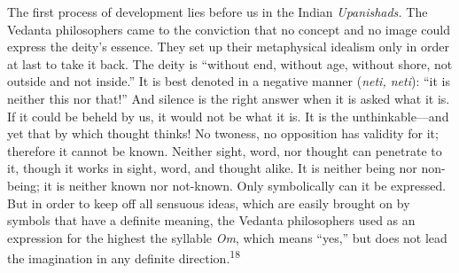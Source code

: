\documentclass[12pt,a4paper]{book}
\newcommand{\opage}[1]{\marginnote{\footnotesize\textit{[#1]}}}
\begin{document}
The first process of development lies before us in the Indian
\emph{Upanishads.} The Vedanta philosophers came to the conviction that no
concept and no image could express the deity's essence. They set up their
metaphysical idealism only in order at last to take it back. The deity is
``without end, without age, without shore, not outside and not inside.'' It is
best denoted in a negative manner (\textit{neti, neti}): ``it is neither this
nor that!'' And silence is the right answer when it is asked what it is. If it
could be beheld by us, it would not be what it is. It is the unthinkable---and
yet that by which thought thinks! No twoness, no opposition has validity for
it; therefore it cannot be known. Neither sight, word, nor thought can
penetrate to it, though it works in sight, word, and thought alike. It is
neither 
\opage{42}being nor non-being; it is neither known nor not-known. Only
symbolically can it be expressed. But in order to keep off all sensuous ideas,
which are easily brought on by symbols that have a definite meaning, the
Vedanta philosophers used as an expression for the highest the syllable
\emph{Om}, which means ``yes,'' but does not lead the imagination in any
definite direction.\textsuperscript{18}
\end{document}
